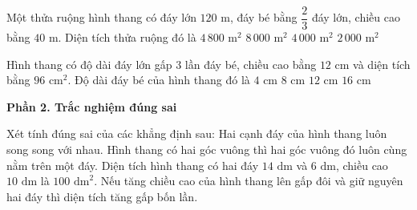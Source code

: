 \begin{ex} %
Một thửa ruộng hình thang có đáy lớn $120\text{ m}$, đáy bé bằng $\dfrac{2}{3}$ đáy lớn, chiều cao bằng $40\text{ m}$. Diện tích thửa ruộng đó là
\choice
{$4\,800\text{ m}^2$}
{$8\,000\text{ m}^2$}
{\True $4\,000\text{ m}^2$}
{$2\,000\text{ m}^2$}
\end{ex}

\begin{ex} %
Hình thang có độ dài đáy lớn gấp $3$ lần đáy bé, chiều cao bằng $12\text{ cm}$ và diện tích bằng $96\text{ cm}^2$. Độ dài đáy bé của hình thang đó là
\choice
{\True $4\text{ cm}$}
{$8\text{ cm}$}
{$12\text{ cm}$}
{$16\text{ cm}$}
\end{ex}

\textbf{Phần 2. Trắc nghiệm đúng sai}

\begin{ex} %
Xét tính đúng sai của các khẳng định sau:
\choiceTF
{\True Hai cạnh đáy của hình thang luôn song song với nhau.}
{Hình thang có hai góc vuông thì hai góc vuông đó luôn cùng nằm trên một đáy.}
{\True Diện tích hình thang có hai đáy $14\text{ dm}$ và $6\text{ dm}$, chiều cao $10\text{ dm}$ là $100\text{ dm}^2$.}
{Nếu tăng chiều cao của hình thang lên gấp đôi và giữ nguyên hai đáy thì diện tích tăng gấp bốn lần.}
\end{ex}

